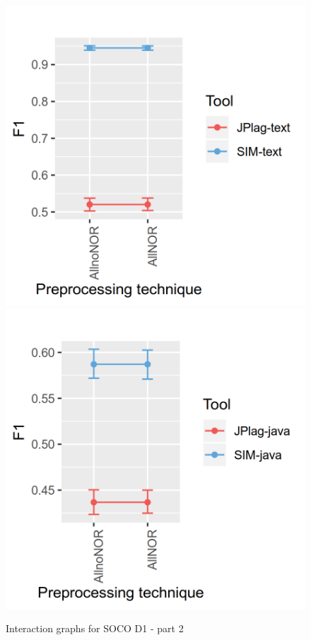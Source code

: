 \documentclass[a4paper, 12pt, oneside, openany, final, pdftex]{book}\usepackage[]{graphicx}\usepackage[]{color}
\makeatletter
\def\maxwidth{ %
  \ifdim\Gin@nat@width>\linewidth
    \linewidth
  \else
    \Gin@nat@width
  \fi
}
\makeatother
\begin{document}
\begin{appendices}
\begin{figure}[ht]
\label{fig:interaction- 18 for SOCO D1 }\endminipage\hfill {} 
\includegraphics[width=\maxwidth]{figure/Figure-SOCO-INTERACTION-19} 
\label{fig:interaction- 19 for SOCO D1 }\endminipage\hfill {} 
\includegraphics[width=\maxwidth]{figure/Figure-SOCO-INTERACTION-20} 
\label{fig:interaction- 20 for SOCO D1 }\endminipage\hfill \caption{Interaction graphs for  SOCO D1  - part 2}\label{fig:interaction SOCO D1 -part2}\end{figure}
\end{appendices}
    \printbibliography[heading=bibintoc, notcategory=fullcited]
  
  \backmatter
  
    
\end{document}
